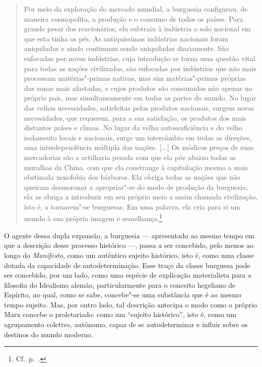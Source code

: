 \begin{quote} 
Por meio da exploração do mercado mundial, a burguesia configurou, de
maneira cosmopolita, a produção e o consumo de todos os países. Para
grande pesar dos reacionários, ela subtraiu à indústria o solo nacional
em que esta tinha os pés. As antiquíssimas indústrias nacionais foram
aniquiladas e ainda continuam sendo aniquiladas diariamente. São
sufocadas por novas indústrias, cuja introdução se torna uma questão
vital para todas as nações civilizadas, são sufocadas por indústrias que não mais
processam matérias"-primas nativas, mas sim matérias"-primas próprias
das zonas mais afastadas, e cujos produtos são consumidos não apenas no
próprio país, mas simultaneamente em todas as partes do mundo. No lugar
das velhas necessidades, satisfeitas pelos produtos nacionais, surgem
novas necessidades, que requerem, para a sua satisfação, os produtos dos
mais distantes países e climas. No lugar da velha autossuficiência e
do velho isolamento locais e nacionais, surge um intercâmbio em
todas as direções, uma interdependência múltipla das nações. [...] Os
módicos preços de suas mercadorias são a artilharia pesada com que ela
põe abaixo todas as muralhas da China, com que ela constrange à
capitulação mesmo a mais obstinada xenofobia dos bárbaros. Ela obriga
todas as nações que não queiram desmoronar a apropriar"-se do modo de
produção da burguesia; ela as obriga a introduzir em seu próprio meio a
assim chamada civilização, isto é, a tornarem"-se burguesas. Em uma
palavra, ela cria para si um mundo à sua própria imagem e semelhança.\footnote{ Cf.~p.~\pageref{5}.}
\end{quote} 

O agente dessa dupla expansão, a burguesia --- apresentado ao mesmo tempo
em que a descrição desse processo histórico ---, passa a ser concebido,
pelo menos ao longo do \textit{Manifesto}, como um autêntico sujeito
histórico, isto é, como uma classe dotada da capacidade de
autodeterminação. Esse traço da classe burguesa pode ser concebido, por
um lado, como uma espécie de explicação materialista para a filosofia
do Idealismo alemão, particularmente para o conceito hegeliano de
Espírito, no qual, como se sabe, concebe"-se uma substância que é ao
mesmo tempo sujeito. Mas, por outro lado, tal descrição antecipa o
modo como o próprio Marx concebe o proletariado: como um “sujeito
histórico”, isto é, como um agrupamento coletivo, autônomo, capaz de se
autodeterminar e influir sobre os destinos do mundo moderno.

